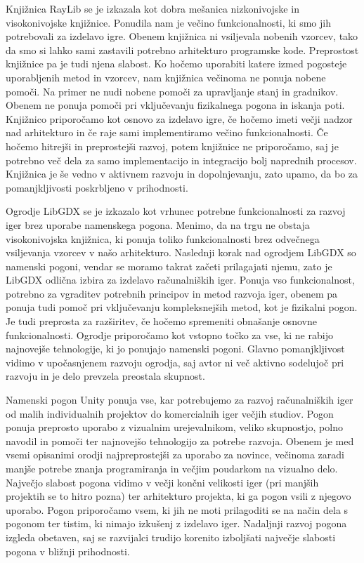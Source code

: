 \documentclass[12pt,a4paper,twoside]{book}
\begin{document}
Knjižnica RayLib se je izkazala kot dobra mešanica nizkonivojske in visokonivojske knjižnice. Ponudila nam je večino funkcionalnosti, ki smo jih potrebovali za izdelavo igre. Obenem knjižnica ni vsiljevala nobenih vzorcev, tako da smo si lahko sami zastavili potrebno arhitekturo programske kode. Preprostost knjižnice pa je tudi njena slabost. Ko hočemo uporabiti katere izmed pogosteje uporabljenih metod in vzorcev, nam knjižnica večinoma ne ponuja nobene pomoči. Na primer ne nudi nobene pomoči za upravljanje stanj in gradnikov. Obenem ne ponuja pomoči pri vključevanju fizikalnega pogona in iskanja poti. Knjižnico priporočamo kot osnovo za izdelavo igre, če hočemo imeti večji nadzor nad arhitekturo in če raje sami implementiramo večino funkcionalnosti. Če hočemo hitrejši in preprostejši razvoj, potem knjižnice ne priporočamo, saj je potrebno več dela za samo implementacijo in integracijo bolj naprednih procesov. Knjižnica je še vedno v aktivnem razvoju in dopolnjevanju, zato upamo, da bo za pomanjkljivosti poskrbljeno v prihodnosti. 

Ogrodje LibGDX se je izkazalo kot vrhunec potrebne funkcionalnosti za razvoj iger brez uporabe namenskega pogona. Menimo, da na trgu ne obstaja visokonivojska knjižnica, ki ponuja toliko funkcionalnosti brez odvečnega vsiljevanja vzorcev v našo arhitekturo. Naslednji korak nad ogrodjem LibGDX so namenski pogoni, vendar se moramo takrat začeti prilagajati njemu, zato je LibGDX odlična izbira za izdelavo računalniških iger. Ponuja vso funkcionalnost, potrebno za vgraditev potrebnih principov in metod razvoja iger, obenem pa ponuja tudi pomoč pri vključevanju kompleksnejših metod, kot je fizikalni pogon. Je tudi preprosta za razširitev, če hočemo spremeniti obnašanje osnovne funkcionalnosti. Ogrodje priporočamo kot vstopno točko za vse, ki ne rabijo najnovejše tehnologije, ki jo ponujajo namenski pogoni. Glavno pomanjkljivost vidimo v upočasnjenem razvoju ogrodja, saj avtor ni več aktivno sodelujoč pri razvoju in je delo prevzela preostala skupnost.

Namenski pogon Unity ponuja vse, kar potrebujemo za razvoj računalniških iger od malih individualnih projektov do komercialnih iger večjih studiov. Pogon ponuja preprosto uporabo z vizualnim urejevalnikom, veliko skupnostjo, polno navodil in pomoči ter najnovejšo tehnologijo za potrebe razvoja. Obenem je med vsemi opisanimi orodji najpreprostejši za uporabo za novince, večinoma zaradi manjše potrebe znanja programiranja in večjim poudarkom na vizualno delo. Največjo slabost pogona vidimo v večji končni velikosti iger (pri manjših projektih se to hitro pozna) ter arhitekturo projekta, ki ga pogon vsili z njegovo uporabo. Pogon priporočamo vsem, ki jih ne moti prilagoditi se na način dela s pogonom ter tistim, ki nimajo izkušenj z izdelavo iger. Nadaljnji razvoj pogona izgleda obetaven, saj se razvijalci trudijo korenito izboljšati največje slabosti pogona v bližnji prihodnosti.
\end{document}
